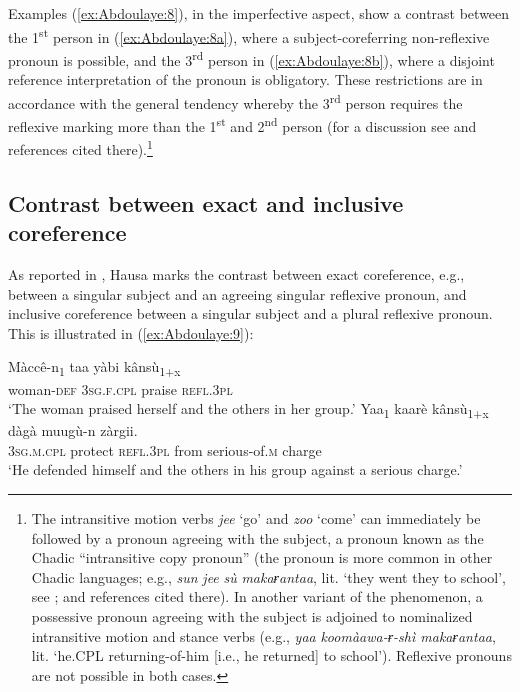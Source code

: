 \documentclass[output=paper]{langscibook}
\begin{document}
Examples (\ref{ex:Abdoulaye:8}), in the imperfective aspect, show a contrast between the 1\textsuperscript{st} person in (\ref{ex:Abdoulaye:8a}), where a subject-coreferring non-reflexive pronoun is possible, and the 3\textsuperscript{rd} person in (\ref{ex:Abdoulaye:8b}), where a disjoint reference interpretation of the pronoun is obligatory. These restrictions are in accordance with the general tendency whereby the 3\textsuperscript{rd} person requires the reflexive marking more than the 1\textsuperscript{st} and 2\textsuperscript{nd} person (for a discussion see \citealt[43]{Haspelmath2008} and references cited there).\footnote{The intransitive motion verbs \textit{jee} ‘go’ and \textit{zoo} ‘come’ can immediately be followed by a pronoun agreeing with the subject, a pronoun known as the Chadic “intransitive copy pronoun” (the pronoun is more common in other Chadic languages; e.g., \textit{sun} \textit{jee} \textit{sù} \textit{makaɍantaa}, lit. ‘they went they to school’, see \citealt[407]{Jaggar2001}; \citealt[479]{Newman2000} and references cited there). In another variant of the phenomenon, a possessive pronoun agreeing with the subject is adjoined to nominalized intransitive motion and stance verbs (e.g., \textit{yaa} \textit{koomàawa-ɍ{}-shì makaɍantaa}, lit. ‘he.CPL returning-of-him [i.e., he returned] to school’). Reflexive pronouns are not possible in both cases.}


\subsection{Contrast between exact and inclusive coreference} \label{sec:Abdoulaye:3.2}

As reported in \citet[524]{Newman2000}, Hausa marks the contrast between exact coreference, e.g., between a singular subject and an agreeing singular reflexive pronoun, and inclusive coreference between a singular subject and a plural reflexive pronoun. This is illustrated in (\ref{ex:Abdoulaye:9}):

\ea%
    \label{ex:Abdoulaye:9}
    \ea   \label{ex:Abdoulaye:9a}
    \gll  Màccê-n\textsubscript{1}  taa  yàbi  kânsù\textsubscript{1+x} \\
    woman-\textsc{def}  \textsc{3sg.f.cpl}  praise  \textsc{refl.3pl}\\
    \glt `The woman praised herself and the others in her group.’
    \ex  \label{ex:Abdoulaye:9b}
    \gll Yaa\textsubscript{1}  kaarè  kânsù\textsubscript{1+x}  dàgà  muugù-n  zàrgii.\\
    \textsc{3sg.m.cpl}  protect  \textsc{refl.3pl}  from  serious-of.\textsc{m}  charge\\
    \glt `He defended himself and the others in his group against a serious charge.’
    \z
\z 
         
\end{document}
